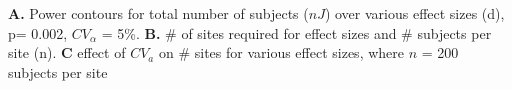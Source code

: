 \label{fig:power} \textbf{A.} Power contours for total number of subjects ($nJ$) over various effect sizes (d), p= 0.002, $CV_\alpha$ = 5\%. \textbf{B.} \# of sites required for effect sizes and \# subjects per site (n). \textbf{C} effect of $CV_a$ on \# sites for various effect sizes, where $n$ = 200 subjects per site